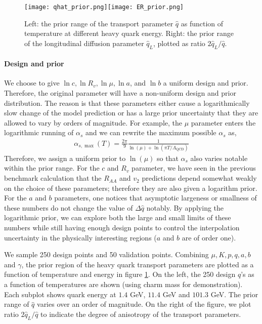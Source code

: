 \begin{figure}
\singlespacing
\centering
\texttt{[image: qhat\_prior.png]}\texttt{[image: ER\_prior.png]}
\caption[Left: the prior range of the transport parameter $\hat{q}$ as function]{Left: the prior range of the transport parameter $\hat{q}$ as function of temperature at different heavy quark energy. Right: the prior range of the longitudinal diffusion parameter $\hat{q}_L$, plotted as ratio $2\hat{q}_L/\hat{q}$.}
\label{fig:new:design-qhat}
\end{figure}

\paragraph{Design and prior} 
We choose to give $\ln c, \ln R_v, \ln \mu, \ln a$, and $\ln b$ a uniform design and prior.
Therefore, the original parameter will have a non-uniform design and prior distribution.
The reason is that these parameters either cause a logarithmically slow change of the model prediction or has a large prior uncertainty that they are allowed to vary by orders of magnitude.
For example, the $\mu$ parameter enters the logarithmic running of $\alpha_s$ and we can rewrite the maximum possible $\alpha_s$ as,
\begin{eqnarray}
\alpha_{s,\max}(T) = \frac{2\pi}{9}\frac{1}{\ln(\mu) + \ln(\pi T/\Lambda_{\textrm{QCD}})}
\end{eqnarray}
Therefore, we assign a uniform prior to $\ln(\mu)$ so that $\alpha_s$ also varies notable within the prior range.
For the $c$ and $R_v$ parameter, we have seen in the previous benchmark calculation that the $R_{AA}$ and $v_2$ predictions depend somewhat weakly on the choice of these parameters; therefore they are also given a logarithm prior.
For the $a$ and $b$ parameters, one notices that asymptotic largeness or smallness of these numbers do not change the value of $\Delta \hat{q}$ notably.
By applying the logarithmic prior, we can explore both the large and small limits of these numbers while still having enough design points to control the interpolation uncertainty in the physically interesting regions ($a$ and $b$ are of order one). 

We sample 250 design points and 50 validation points. 
Combining $\mu, K, p, q, a, b$ and $\gamma$, the prior region of the heavy quark transport parameters are plotted as a function of temperature and energy in figure \ref{fig:new:design-qhat}. 
On the left, the 250 design $\hat{q}$'s as a function of temperatures are shown  (using charm mass for demonstration).
Each subplot shows quark energy at $1.4$ GeV, $11.4$ GeV and $101.3$ GeV.
The prior range of $\hat{q}$ varies over an order of magnitude.
On the right of the figure, we plot ratio $2\hat{q}_L/\hat{q}$ to indicate the degree of anisotropy of the transport parameters.

